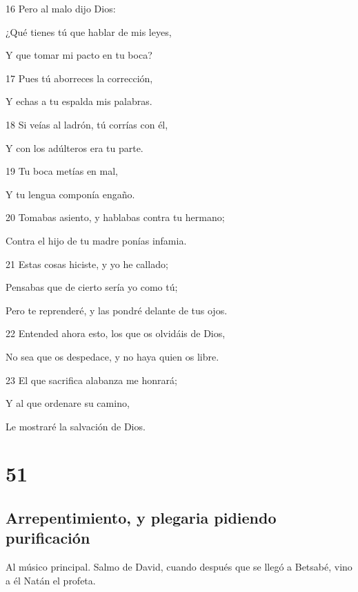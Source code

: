 \par 16 Pero al malo dijo Dios:
\par ¿Qué tienes tú que hablar de mis leyes,
\par Y que tomar mi pacto en tu boca?
\par 17 Pues tú aborreces la corrección,
\par Y echas a tu espalda mis palabras.
\par 18 Si veías al ladrón, tú corrías con él,
\par Y con los adúlteros era tu parte.
\par 19 Tu boca metías en mal,
\par Y tu lengua componía engaño.
\par 20 Tomabas asiento, y hablabas contra tu hermano;
\par Contra el hijo de tu madre ponías infamia.
\par 21 Estas cosas hiciste, y yo he callado;
\par Pensabas que de cierto sería yo como tú;
\par Pero te reprenderé, y las pondré delante de tus ojos.
\par 22 Entended ahora esto, los que os olvidáis de Dios,
\par No sea que os despedace, y no haya quien os libre.
\par 23 El que sacrifica alabanza me honrará;
\par Y al que ordenare su camino,
\par Le mostraré la salvación de Dios.

\chapter{51}

\section*{Arrepentimiento, y plegaria pidiendo purificación}

\par Al músico principal. Salmo de David, cuando después que se llegó a Betsabé, vino a él Natán el profeta.

